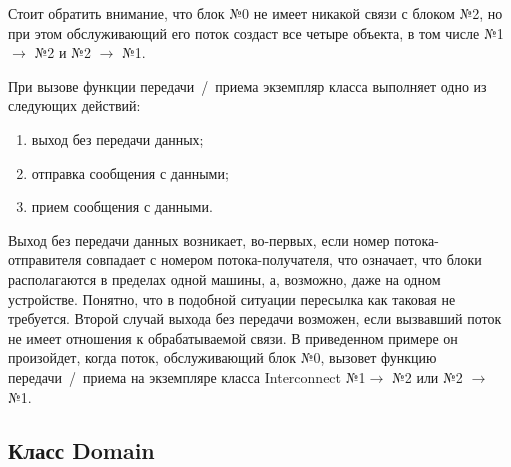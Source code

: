 \documentclass[a4paper, 14pt]{extarticle}
\theoremstyle{definition}
\begin{document}
\par Стоит обратить внимание, что блок №0 не имеет никакой связи с блоком №2, но при этом обслуживающий его поток создаст все четыре объекта, в том числе {№1 $\to$ №2} и {№2 $\to$ №1}. 

\par При вызове функции передачи~/~приема экземпляр класса выполняет одно из следующих действий:
\begin{enumerate}
\item выход без передачи данных;
\item отправка сообщения с данными;
\item прием сообщения с данными.
\end{enumerate}

\par Выход без передачи данных возникает, во-первых, если номер потока-отправителя совпадает с номером потока-получателя, что означает, что блоки располагаются в пределах одной машины, а, возможно, даже на одном устройстве. Понятно, что в подобной ситуации пересылка как таковая не требуется. Второй случай выхода без передачи возможен, если вызвавший поток не имеет отношения к обрабатываемой связи. В приведенном примере он произойдет, когда поток, обслуживающий блок №0, вызовет функцию передачи~/~приема на экземпляре класса Interconnect {№1$\to$ №2} или {№2 $\to$ №1}.


\subsection{Класс Domain}
\end{document}
